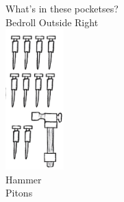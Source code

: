 \documentclass[11pt]{article}
\begin{document}
\begin{paracol}{3}
    \normalsize{What's in these pocketses?\\Bedroll}
    \switchcolumn
    \centering
    \normalsize{Outside Right}\\
    \includegraphics[height=5.4cm]{img/HammerAndPitons.png}\\
    \normalsize{Hammer\\Pitons}
\end{paracol}
\vspace{1.5cm}
\end{document}
